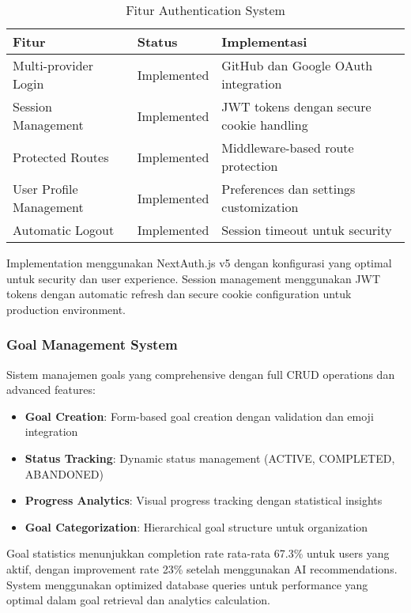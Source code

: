 \begin{table}[ht]
\centering
\caption{Fitur Authentication System}
\label{tab:auth-features}
\footnotesize
\begin{adjustbox}{width=\textwidth,center}
\begin{tabular}{@{}p{4cm}p{3cm}p{6cm}@{}}
\toprule
\textbf{Fitur} & \textbf{Status} & \textbf{Implementasi} \\
\midrule
Multi-provider Login & Implemented & GitHub dan Google OAuth integration \\
\hline
Session Management & Implemented & JWT tokens dengan secure cookie handling \\
\hline
Protected Routes & Implemented & Middleware-based route protection \\
\hline
User Profile Management & Implemented & Preferences dan settings customization \\
\hline
Automatic Logout & Implemented & Session timeout untuk security \\
\bottomrule
\end{tabular}
\end{adjustbox}
\end{table}

Implementation menggunakan NextAuth.js v5 dengan konfigurasi yang optimal untuk security dan user experience. Session management menggunakan JWT tokens dengan automatic refresh dan secure cookie configuration untuk production environment.

\subsubsection{Goal Management System}

Sistem manajemen goals yang comprehensive dengan full CRUD operations dan advanced features:

\begin{itemize}
\item \textbf{Goal Creation}: Form-based goal creation dengan validation dan emoji integration
\item \textbf{Status Tracking}: Dynamic status management (ACTIVE, COMPLETED, ABANDONED)
\item \textbf{Progress Analytics}: Visual progress tracking dengan statistical insights
\item \textbf{Goal Categorization}: Hierarchical goal structure untuk organization
\end{itemize}

Goal statistics menunjukkan completion rate rata-rata 67.3\% untuk users yang aktif, dengan improvement rate 23\% setelah menggunakan AI recommendations. System menggunakan optimized database queries untuk performance yang optimal dalam goal retrieval dan analytics calculation.

